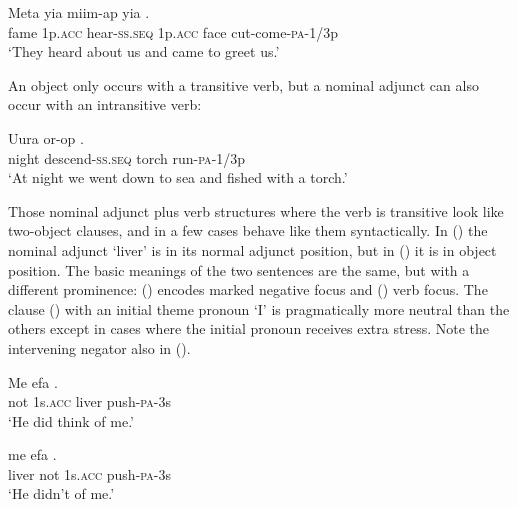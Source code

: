 \ea%
\label{ex:x450}
\gll Meta yia miim-ap yia  . \\
fame 1p.\textsc{acc} hear-\textsc{ss}.\textsc{seq} 1p.\textsc{acc} face cut-come-\textsc{pa}-1/3p\\
\glt`They heard about us and came to greet us.'
\z

An object  only occurs with a transitive verb, but a nominal adjunct can also occur with an intransitive verb:

\ea%
\label{ex:x451}
\gll Uura or-op  . \\
night descend-\textsc{ss}.\textsc{seq} torch run-\textsc{pa}-1/3p\\
\glt`At night we went down to sea and fished with a torch.'
\z

Those nominal adjunct plus verb structures where the verb is transitive look like two-object clauses, and in a few cases behave like them syntactically. In () the nominal adjunct  `liver' is in its normal adjunct position, but in () it is in object  position. The basic meanings of the two sentences are the same, but with a different prominence: () encodes marked negative focus and () verb focus. The clause () with an initial theme pronoun  `I' is pragmatically more neutral than the others except in cases where the initial pronoun receives extra stress. Note the intervening negator also in (). 

\ea%
\label{ex:x452}
\gll Me efa  . \\
not 1s.\textsc{acc} liver push-\textsc{pa}-3s\\
\glt`He did  think of me.'
\z

\ea%
\label{ex:x453}
\gll {} me efa . \\
liver not 1s.\textsc{acc} push-\textsc{pa}-3s\\
\glt`He didn't  of me.'
\z

